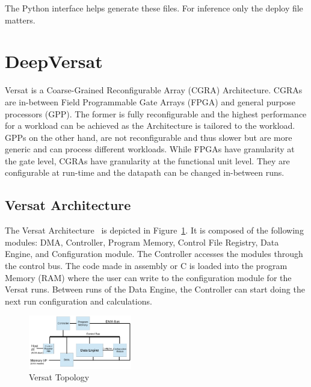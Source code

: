 \documentclass[conference]{IEEEtran}
\begin{document}
The Python interface helps generate these files. For inference only the
deploy file matters. 

% 








\section{DeepVersat}
\label{sector:DeepVersat}

\quad Versat is a Coarse-Grained Reconfigurable Array (CGRA) Architecture. CGRAs are in-between Field Programmable Gate Arrays (FPGA)
 and general purpose processors (GPP).
The former is fully reconfigurable and the highest performance for a workload can be achieved as the Architecture is tailored to the workload.
GPPs on the other hand, are not reconfigurable and thus slower but are more generic and can process different workloads.
While FPGAs have granularity at the gate level, CGRAs have granularity at the functional unit level. They are configurable at run-time and the datapath can be
changed in-between runs.

\subsection{Versat Architecture}

\quad The Versat Architecture~\cite{sousa:compiler,sousa:controller,sousa:FFT,sousa:versat2016} 
is depicted in Figure~\ref{figure:oldversat}. It is composed of the following modules: DMA, Controller, Program Memory, Control File Registry, Data Engine, and Configuration module.
The Controller accesses the modules through the control bus. The code made in assembly or C is loaded into the program Memory (RAM) where the user
can write to the configuration module for the Versat runs. Between runs of the Data Engine,
 the Controller can start doing the next run configuration and calculations.


\begin{figure}[!htbp]
    \centering
    \includegraphics[width=0.4\textwidth]{Figures/top.png}
    \caption{Versat Topology~\cite{sousa:controller}}
    \label{figure:oldversat}
\end{figure} 
\end{document}
